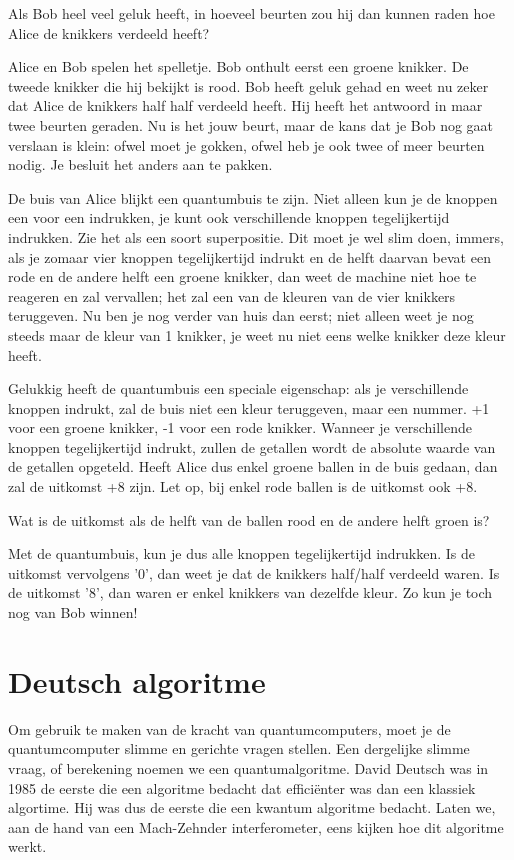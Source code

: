\documentclass[../../main.tex]{subfiles}
\begin{document}
Als Bob heel veel geluk heeft, in hoeveel beurten zou hij dan kunnen raden hoe Alice de knikkers verdeeld heeft?

Alice en Bob spelen het spelletje. Bob onthult eerst een groene knikker. De tweede knikker die hij bekijkt is rood. Bob heeft geluk gehad en weet nu zeker dat Alice de knikkers half half verdeeld heeft. Hij heeft het antwoord in maar twee beurten geraden. Nu is het jouw beurt, maar de kans dat je Bob nog gaat verslaan is klein: ofwel moet je gokken, ofwel heb je ook twee of meer beurten nodig. Je besluit het anders aan te pakken.

De buis van Alice blijkt een quantumbuis te zijn. Niet alleen kun je de knoppen een voor een indrukken, je kunt ook verschillende knoppen tegelijkertijd indrukken. Zie het als een soort superpositie. Dit moet je wel slim doen, immers, als je zomaar vier knoppen tegelijkertijd indrukt en de helft daarvan bevat een rode en de andere helft een groene knikker, dan weet de machine niet hoe te reageren en zal vervallen;
het zal een van de kleuren van de vier knikkers teruggeven. Nu ben je nog verder van huis dan eerst; niet alleen weet je nog steeds maar de kleur van 1 knikker, je weet nu niet eens welke knikker deze kleur
heeft.

Gelukkig heeft de quantumbuis een speciale eigenschap: als je verschillende knoppen indrukt, zal de buis niet een kleur teruggeven, maar een nummer. +1 voor een groene knikker, -1 voor een rode knikker. Wanneer je verschillende knoppen tegelijkertijd indrukt, zullen de getallen wordt de absolute waarde van de getallen opgeteld. Heeft Alice dus enkel groene ballen in de buis gedaan, dan zal de uitkomst +8 zijn. Let op, bij enkel rode ballen is de uitkomst ook +8.

Wat is de uitkomst als de helft van de ballen rood en de andere helft groen is?

Met de quantumbuis, kun je dus alle knoppen tegelijkertijd indrukken. Is de uitkomst vervolgens '0', dan weet je dat de knikkers half/half verdeeld waren. Is de uitkomst '8', dan waren er enkel knikkers van dezelfde kleur. Zo kun je toch nog van Bob winnen!

\section{Deutsch algoritme}
Om gebruik te maken van de kracht van quantumcomputers, moet je de quantumcomputer slimme en gerichte vragen stellen. Een dergelijke slimme vraag, of berekening noemen we een quantumalgoritme. David Deutsch was in 1985 de eerste die een algoritme bedacht dat effici\"enter was dan een klassiek algortime. Hij was dus de eerste die een kwantum algoritme bedacht. Laten we, aan de hand van een Mach-Zehnder interferometer, eens kijken hoe dit algoritme werkt.
\end{document}
